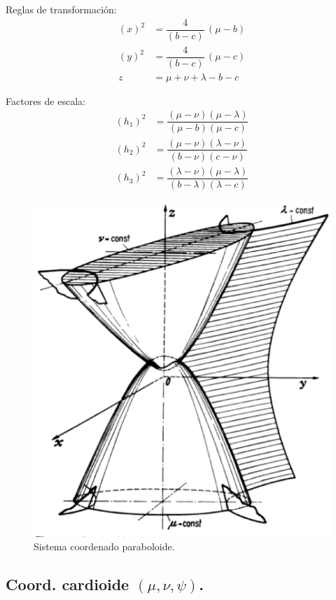Reglas de transformación:
\begin{align*}
(x)^{2} &= \dfrac{4}{(b - c)} \, (\mu - b) \\[0.5em]
(y)^{2} &= \dfrac{4}{(b - c)} \, (\mu - c) \\[0.5em]
z &= \mu + \nu + \lambda - b - c
\end{align*}

Factores de escala:
\begin{align*}
(h_{1})^{2} &= \dfrac{(\mu - \nu)(\mu - \lambda)}{(\mu - b)(\mu - c)} \\[0.5em]
(h_{2})^{2} &= \dfrac{(\mu - \nu)(\lambda - \nu)}{(b - \nu)(c - \nu)} \\[0.5em]
(h_{3})^{2} &= \dfrac{(\lambda - \nu)(\mu - \lambda)}{(b - \lambda)(\lambda - c)}
\end{align*}

\begin{figure}[H]
    \centering
    \includegraphics[scale=0.5]{Imagenes/Sistema_Paraboloide.eps}
    \caption{Sistema coordenado paraboloide.}
\end{figure}

\subsection{Coord. cardioide \texorpdfstring{$(\mu, \nu, \psi)$}{(m, n, p)}.}

